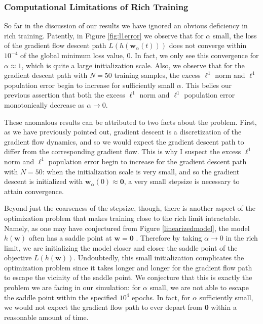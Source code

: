 \documentclass{article}
\begin{document}
\subsubsection{Computational Limitations of Rich Training}
So far in the discussion of our results we have ignored an obvious deficiency in rich training. Patently, in Figure \ref{fig:l1error} we observe that for $\alpha$ small, the loss of the gradient flow descent path $L(h(\boldsymbol{w}_{\alpha}(t)))$ does not converge within $10^{-4}$ of the global minimum loss value, $0$. In fact, we only see this convergence for $\alpha \approx 1$, which is quite a large initialization scale. Also, we observe that for the gradient descent path with $N=50$ training samples, the excess $\ell^1$ norm and $\ell^1$ population error begin to increase for sufficiently small $\alpha$. This belies our previous assertion that both the excess $\ell^1$ norm and $\ell^1$ population error monotonically decrease as $\alpha \rightarrow 0$.

These anomalous results can be attributed to two facts about the problem. First, as we have previously pointed out, gradient descent is a discretization of the gradient flow dynamics, and so we would expect the gradient descent path to differ from the corresponding gradient flow. This is why I suspect the excess $\ell^1$ norm and $\ell^1$ population error begin to increase for the gradient descent path with $N=50$: when the initialization scale is very small, and so the gradient descent is initialized with $\boldsymbol{w}_{\alpha}(0) \approx \boldsymbol{0}$, a very small stepsize is necessary to attain convergence. 

Beyond just the coarseness of the stepsize, though, there is another aspect of the optimization problem that makes training close to the rich limit intractable. Namely, as one may have conjectured from Figure \ref{linearizedmodel}, the model $h(\boldsymbol{w})$ often has a saddle point at $\boldsymbol{w} = \boldsymbol{0}$ \cite{woodworth2020kernel}. Therefore by taking $\alpha \rightarrow 0$ in the rich limit, we are initializing the model closer and closer the saddle point of the objective $L(h(\boldsymbol{w}))$. Undoubtedly, this small initialization complicates the optimization problem since it takes longer and longer for the gradient flow path to escape the vicinity of the saddle point. We conjecture that this is exactly the problem we are facing in our simulation: for $\alpha$ small, we are not able to escape the saddle point within the specified $10^4$ epochs. In fact, for $\alpha$ sufficiently small, we would not expect the gradient flow path to ever depart from $\boldsymbol{0}$ within a reasonable amount of time. 
\end{document}
